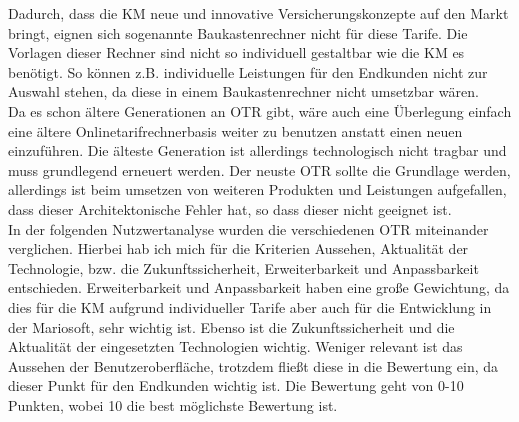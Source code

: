 Dadurch, dass die \ac{KM} neue und innovative Versicherungskonzepte auf den Markt bringt, eignen sich sogenannte Baukastenrechner nicht für diese Tarife. Die Vorlagen dieser Rechner sind nicht so individuell gestaltbar wie die \ac{KM} es benötigt. So können z.B. individuelle Leistungen für den Endkunden nicht zur Auswahl stehen, da diese in einem Baukastenrechner nicht umsetzbar wären.\\
Da es schon ältere Generationen an \ac{OTR} gibt, wäre auch eine Überlegung einfach eine ältere Onlinetarifrechnerbasis weiter zu benutzen anstatt einen neuen einzuführen. Die älteste Generation ist allerdings technologisch nicht tragbar und muss grundlegend erneuert werden. Der neuste \ac{OTR} sollte die Grundlage werden, allerdings ist beim umsetzen von weiteren Produkten und Leistungen aufgefallen, dass dieser Architektonische Fehler hat, so dass dieser nicht geeignet ist.\\
In der folgenden Nutzwertanalyse wurden die verschiedenen \ac{OTR} miteinander verglichen. Hierbei hab ich mich für die Kriterien Aussehen, Aktualität der Technologie, bzw. die Zukunftssicherheit, Erweiterbarkeit und Anpassbarkeit entschieden. Erweiterbarkeit und Anpassbarkeit haben eine große Gewichtung, da dies für die \ac{KM} aufgrund individueller Tarife aber auch für die Entwicklung in der Mariosoft, sehr wichtig ist. Ebenso ist die Zukunftssicherheit und die Aktualität der eingesetzten Technologien wichtig. Weniger relevant ist das Aussehen der Benutzeroberfläche, trotzdem fließt diese in die Bewertung ein, da dieser Punkt für den Endkunden wichtig ist. Die Bewertung geht von 0-10 Punkten, wobei 10 die best möglichste Bewertung ist.\\
\\

